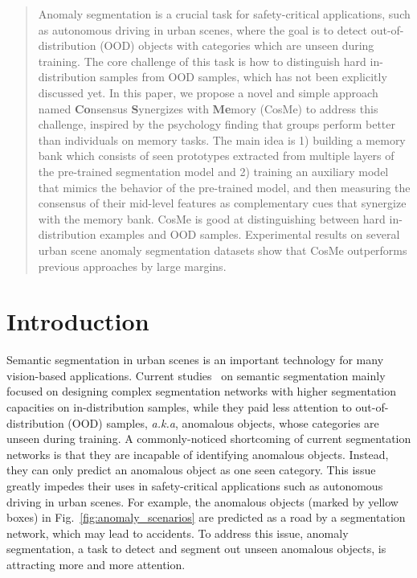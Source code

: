 \documentclass[10pt,twocolumn,letterpaper]{article}
\begin{document}
\begin{abstract}
\vspace{-14pt}
Anomaly segmentation is a crucial task for safety-critical applications, such as autonomous driving in urban scenes, where the goal is to detect out-of-distribution (OOD) objects with categories which are unseen during training. The core challenge of this task is how to distinguish hard in-distribution samples from OOD samples, which has not been explicitly discussed yet. In this paper, we propose a novel and simple approach named \textbf{Co}nsensus \textbf{S}ynergizes with \textbf{Me}mory (CosMe) to address this challenge, inspired by the psychology finding that groups perform better than individuals on memory tasks. The main idea is 1) building a memory bank which consists of seen prototypes extracted from multiple layers of the pre-trained segmentation model and 2) training an auxiliary model that mimics the behavior of the pre-trained model, and then measuring the consensus of their mid-level features as complementary cues that synergize with the memory bank. CosMe is good at distinguishing between hard in-distribution examples and OOD samples. Experimental results on several urban scene anomaly segmentation datasets show that CosMe outperforms previous approaches by large margins.


















\end{abstract}

\section{Introduction}
\label{sec:intro}








Semantic segmentation in urban scenes is an important technology for many vision-based applications. Current studies~\cite{fcn,unet,seg1,seg2,seg3,seg4} on semantic segmentation mainly focused on designing complex segmentation networks with higher segmentation capacities on in-distribution samples, while they paid less attention to out-of-distribution (OOD) samples, \emph{a.k.a}, anomalous objects, whose categories are unseen during training. A commonly-noticed shortcoming of current segmentation networks is that they are incapable of identifying anomalous objects. Instead, they can only predict an anomalous object as one seen category. This issue greatly impedes their uses in safety-critical applications such as autonomous driving in urban scenes. For example, the anomalous objects (marked by yellow boxes) in Fig.~\ref{fig:anomaly_scenarios} are predicted as a road by a segmentation network, which may lead to accidents. To address this issue, anomaly segmentation, a task to detect and segment out unseen anomalous objects, is attracting more and more attention.
\end{document}
